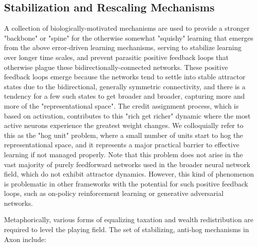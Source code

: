 \documentclass[11pt,twoside]{article}
\newif\myifpdf
\begin{document}
\subsection{Stabilization and Rescaling Mechanisms}

A collection of biologically-motivated mechanisms are used to provide a stronger "backbone" or "spine" for the otherwise somewhat "squishy" learning that emerges from the above error-driven learning mechanisms, serving to stabilize learning over longer time scales, and prevent parasitic positive feedback loops that otherwise plague these bidirectionally-connected networks. These positive feedback loops emerge because the networks tend to settle into stable attractor states due to the bidirectional, generally symmetric connectivity, and there is a tendency for a few such states to get broader and broader, capturing more and more of the "representational space". The credit assignment process, which is based on activation, contributes to this "rich get richer" dynamic where the most active neurons experience the greatest weight changes. We colloquially refer to this as the "hog unit" problem, where a small number of units start to hog the representational space, and it represents a major practical barrier to effective learning if not managed properly. Note that this problem does not arise in the vast majority of purely feedforward networks used in the broader neural network field, which do not exhibit attractor dynamics. However, this kind of phenomenon is problematic in other frameworks with the potential for such positive feedback loops, such as on-policy reinforcement learning or generative adversarial networks.

Metaphorically, various forms of equalizing taxation and wealth redistribution are required to level the playing field. The set of stabilizing, anti-hog mechanisms in Axon include:
\end{document}
